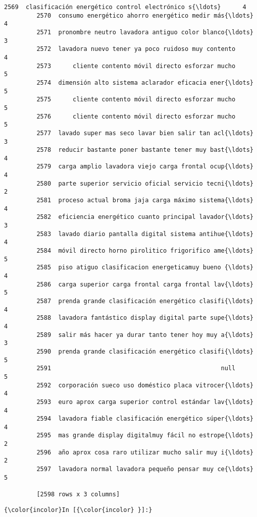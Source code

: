 \documentclass{article}
\begin{document}
\begin{Verbatim}[commandchars=\\\{\}]
         2569  clasificación energético control electrónico s{\ldots}      4  
         2570  consumo energético ahorro energético medir más{\ldots}      4  
         2571  pronombre neutro lavadora antiguo color blanco{\ldots}      3  
         2572  lavadora nuevo tener ya poco ruidoso muy contento      4  
         2573      cliente contento móvil directo esforzar mucho      5  
         2574  dimensión alto sistema aclarador eficacia ener{\ldots}      5  
         2575      cliente contento móvil directo esforzar mucho      5  
         2576      cliente contento móvil directo esforzar mucho      5  
         2577  lavado super mas seco lavar bien salir tan acl{\ldots}      3  
         2578  reducir bastante poner bastante tener muy bast{\ldots}      4  
         2579  carga amplio lavadora viejo carga frontal ocup{\ldots}      4  
         2580  parte superior servicio oficial servicio tecni{\ldots}      2  
         2581  proceso actual broma jaja carga máximo sistema{\ldots}      4  
         2582  eficiencia energético cuanto principal lavador{\ldots}      3  
         2583  lavado diario pantalla digital sistema antihue{\ldots}      4  
         2584  móvil directo horno pirolitico frigorifico ame{\ldots}      5  
         2585  piso atiguo clasificacion energeticamuy bueno {\ldots}      4  
         2586  carga superior carga frontal carga frontal lav{\ldots}      5  
         2587  prenda grande clasificación energético clasifi{\ldots}      4  
         2588  lavadora fantástico display digital parte supe{\ldots}      4  
         2589  salir más hacer ya durar tanto tener hoy muy a{\ldots}      3  
         2590  prenda grande clasificación energético clasifi{\ldots}      5  
         2591                                               null      5  
         2592  corporación sueco uso doméstico placa vitrocer{\ldots}      4  
         2593  euro aprox carga superior control estándar lav{\ldots}      4  
         2594  lavadora fiable clasificación energético súper{\ldots}      4  
         2595  mas grande display digitalmuy fácil no estrope{\ldots}      2  
         2596  año aprox cosa raro utilizar mucho salir muy i{\ldots}      2  
         2597  lavadora normal lavadora pequeño pensar muy ce{\ldots}      5  
         
         [2598 rows x 3 columns]
\end{Verbatim}
        
    \begin{Verbatim}[commandchars=\\\{\}]
{\color{incolor}In [{\color{incolor} }]:} 
\end{Verbatim}
\end{document}
